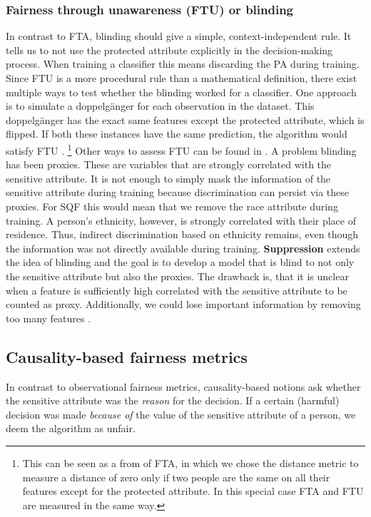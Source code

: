 \subsubsection*{Fairness through unawareness (FTU) or blinding}
In contrast to FTA, blinding should give a simple, context-independent rule. It tells us to not use the protected attribute explicitly in the decision-making process. When training a classifier this means discarding the PA during training.
Since FTU is a more procedural rule than a mathematical definition, there exist multiple ways to test whether the blinding worked for a classifier. One approach is to simulate a doppelgänger for each observation in the dataset. This doppelgänger has the exact same features except the protected attribute, which is flipped.
If both these instances have the same prediction, the algorithm would satisfy FTU \cite{verma2018}. \footnote{This can be seen as a from of FTA, in which we chose the distance metric to measure a distance of zero only if two people are the same on all their features except for the protected attribute. In this special case FTA and FTU are measured in the same way.} Other ways to assess FTU can be found in \cite{verma2018}. 
A problem blinding has been proxies. These are variables that are strongly correlated with the sensitive attribute. It is not enough to simply mask the information of the sensitive attribute during training because discrimination can persist via these proxies.
For SQF this would mean that we remove the race attribute during training.
A person's ethnicity, however, is strongly correlated with their place of residence. Thus, indirect discrimination based on ethnicity remains, even though the information was not directly available during training. \textbf{Suppression} extends the idea of blinding and the goal is to develop a model that is blind to not only the sensitive attribute but also the proxies. The drawback is, that it is unclear when a feature is sufficiently high correlated with the sensitive attribute to be counted as proxy. Additionally, we could lose important information by removing too many features \cite{castelnovo2022}.

\subsection{Causality-based fairness metrics}
In contrast to observational fairness metrics, causality-based notions ask whether the sensitive attribute was the \textit{reason} for the decision. If a certain (harmful) decision was made \textit{because of} the value of the sensitive attribute of a person, we deem the algorithm as unfair.

